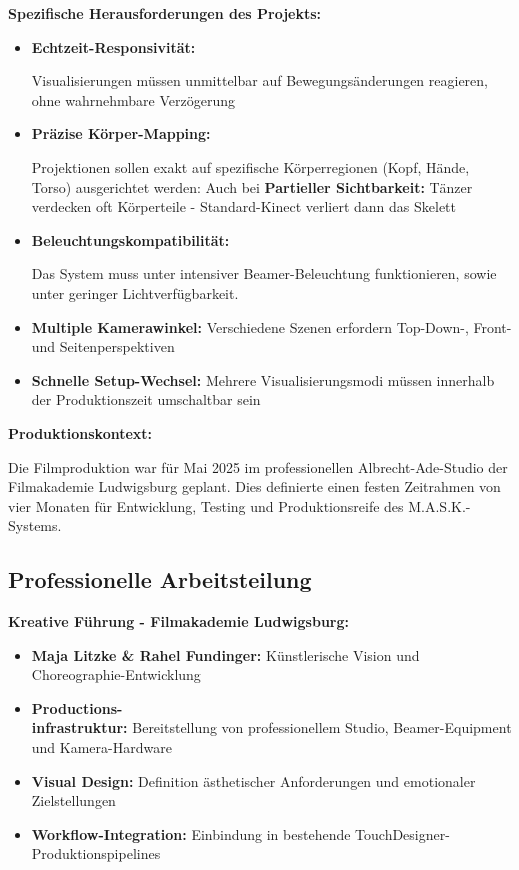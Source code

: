 \textbf{Spezifische Herausforderungen des Projekts:}

\begin{itemize}
    \item \textbf{Echtzeit-Responsivität:} \raggedright Visualisierungen müssen unmittelbar auf Bewegungsänderungen reagieren, ohne wahrnehmbare Verzögerung
    \item \textbf{Präzise Körper-Mapping:} \raggedright Projektionen sollen exakt auf spezifische Körperregionen (Kopf, Hände, Torso) ausgerichtet werden: Auch bei \textbf{Partieller Sichtbarkeit:} Tänzer verdecken oft Körperteile - Standard-Kinect verliert dann das Skelett
    \item \textbf{Beleuchtungskompatibilität:} \raggedright Das System muss unter intensiver Beamer-Beleuchtung funktionieren, sowie unter geringer Lichtverfügbarkeit.
    \item \textbf{Multiple Kamerawinkel:} Verschiedene Szenen erfordern Top-Down-, Front- und Seitenperspektiven
    \item \textbf{Schnelle Setup-Wechsel:} Mehrere Visualisierungsmodi müssen innerhalb der Produktionszeit umschaltbar sein
\end{itemize}

\textbf{Produktionskontext:}

\raggedright Die Filmproduktion war für Mai 2025 im professionellen Albrecht-Ade-Studio der Filmakademie Ludwigsburg geplant. Dies definierte einen festen Zeitrahmen von vier Monaten für Entwicklung, Testing und Produktionsreife des M.A.S.K.-Systems.

\newpage

\subsection{Professionelle Arbeitsteilung}

\textbf{Kreative Führung - Filmakademie Ludwigsburg:}
\begin{itemize}
    \item \textbf{Maja Litzke \& Rahel Fundinger:} Künstlerische Vision und Choreographie-Entwicklung
    \item \textbf{Productions-\\infrastruktur:} Bereitstellung von professionellem Studio, Beamer-Equipment und Kamera-Hardware
    \item \textbf{Visual Design:} Definition ästhetischer Anforderungen und emotionaler Zielstellungen
    \item \textbf{Workflow-Integration:} Einbindung in bestehende TouchDesigner-Produktionspipelines
\end{itemize}

